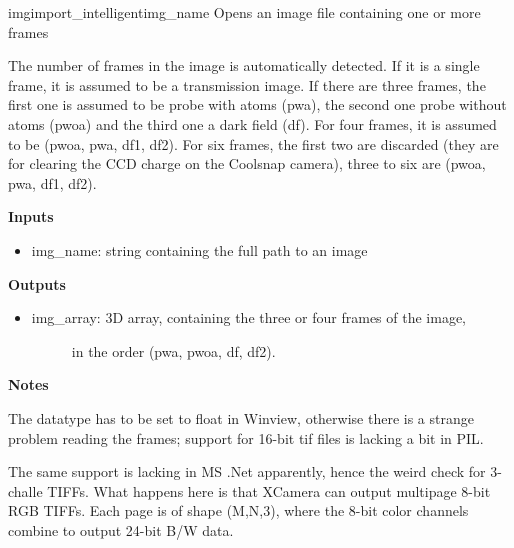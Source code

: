 \documentclass[letterpaper,10pt,english]{manual}
\begin{document}
\hypertarget{imageio.imgimport_intelligent}{}\begin{funcdesc}{imgimport\_intelligent}{img\_name}
Opens an image file containing one or more frames

The number of frames in the image is automatically detected. If it is a
single frame, it is assumed to be a transmission image. If there are three
frames, the first one is assumed to be probe with atoms (pwa), the second
one probe without atoms (pwoa) and the third one a dark field (df).
For four frames, it is assumed to be (pwoa, pwa, df1, df2).
For six frames, the first two are discarded (they are for clearing the
CCD charge on the Coolsnap camera), three to six are (pwoa, pwa, df1, df2).

\textbf{Inputs}
\begin{itemize}
\item {} 
img\_name: string containing the full path to an image

\end{itemize}

\textbf{Outputs}
\begin{itemize}
\item {} \begin{description}
\item[img\_array: 3D array, containing the three or four frames of the image,]
in the  order (pwa, pwoa, df, df2).

\end{description}

\end{itemize}

\textbf{Notes}

The datatype has to be set to float in Winview, otherwise there is a
strange problem reading the frames; support for 16-bit tif files is
lacking a bit in PIL.

The same support is lacking in MS .Net apparently, hence the weird check
for 3-challe TIFFs. What happens here is that XCamera can output multipage
8-bit RGB TIFFs. Each page is of shape (M,N,3), where the 8-bit color
channels combine to output 24-bit B/W data.
\end{funcdesc}
\end{document}

